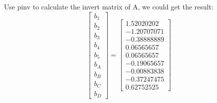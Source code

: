 \documentclass[12pt,a4paper]{article}
\begin{document}
Use pinv to calculate the invert matrix of A, we could get the result:
\begin{equation}
\begin{bmatrix}
b_1\\
b_2\\
b_3\\
b_4\\
b_5\\
b_A\\
b_B\\
b_C\\
b_D
\end{bmatrix}
=
\begin{bmatrix}
1.52020202\\
-1.20707071\\
-0.38888889\\
0.06565657\\
0.06565657\\
-0.19065657\\
-0.00883838\\
-0.37247475\\
0.62752525
\end{bmatrix}
\end{equation}
\end{document}
